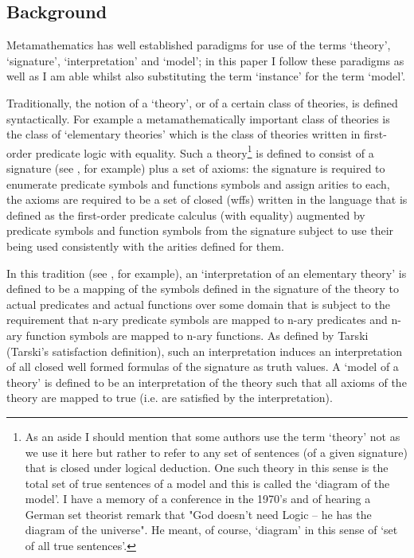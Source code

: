 \subsection{Background}
\note  Metamathematics has well established paradigms for use of the terms
`theory', `signature', `interpretation' and  `model';
in this paper I follow these paradigms
 as well as I am able whilst also substituting the term `instance' for the term `model'. 

Traditionally, the notion of a `theory', or of a certain class of theories, is  defined syntactically.
For example a metamathematically important class of theories  is the class of `elementary theories' 
which is the class of theories written in first-order predicate logic with equality. 
Such a theory\footnote {As an aside I should mention that some authors use the term `theory' not as we use it here but rather to refer to any set of sentences (of a given signature) that is closed under logical deduction. One such theory in this sense is the total set of true sentences of a model and  
this is called the `diagram of the model'. I have a  memory of a conference in the 1970's and of hearing a German set theorist
 remark that "God doesn't need Logic -- he has the diagram of the universe". He meant, of course, `diagram' in this sense of `set of all true sentences'.
} is defined to consist of a signature (see \cite{HodgesModelTheory}, for example) plus a set of axioms: 
the signature is required to enumerate predicate symbols and functions symbols and assign arities to each, 
the axioms are required  to be a set of closed  (wffs) written
in the language that is defined as the first-order predicate calculus (with equality)
 augmented by predicate symbols and function symbols from the signature subject to use their being used consistently with the arities defined for them. 

\note In this tradition (see \cite{Mendelson}, for example), an `interpretation of an elementary theory' is defined to be a mapping of the symbols defined in the signature 
of the theory to actual predicates and actual functions over some domain that is subject to the requirement that n-ary predicate symbols are mapped to n-ary predicates and n-ary function symbols are mapped to n-ary functions.
As defined by Tarski (Tarski's satisfaction definition), 
such an interpretation induces an interpretation of all
closed well formed formulas of the signature as truth values. 
A `model of a theory' is defined to be an interpretation of the theory such that all axioms of the theory are mapped to true (i.e. are satisfied by the interpretation). 

